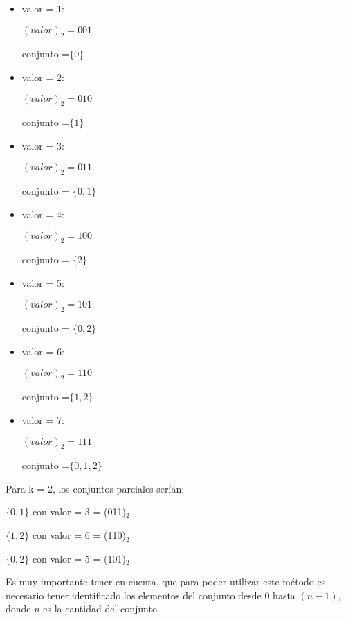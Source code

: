 \begin{itemize}
\item valor = 1:

\quad \quad $(valor)_{2} = 001$

\quad \quad conjunto =$ \lbrace 0 \rbrace $

\item valor = 2:

\quad \quad $(valor)_{2} = 010$

\quad \quad conjunto =$ \lbrace 1 \rbrace $

\item valor = 3:

\quad \quad $(valor)_{2} = 011$

\quad \quad conjunto = $\lbrace 0 , 1 \rbrace$ 

\item valor = 4:

\quad \quad $(valor)_{2} = 100$

\quad \quad conjunto = $\lbrace 2 \rbrace $

\item valor = 5:

\quad \quad $(valor)_{2} = 101$

\quad \quad conjunto = $\lbrace 0 , 2 \rbrace $

\item valor = 6:

\quad \quad $(valor)_{2} = 110$

\quad \quad conjunto =$ \lbrace 1 , 2 \rbrace $

\item valor = 7:

\quad \quad $(valor)_{2} = 111$

\quad \quad conjunto =$ \lbrace 0 , 1 , 2 \rbrace $

\end{itemize}

\quad Para k = 2, los conjuntos parciales ser\'ian:

\quad \quad \quad $\lbrace 0 , 1 \rbrace $ con valor = 3 = (011)$_2$

\quad \quad \quad $\lbrace 1 , 2 \rbrace $ con valor = 6 = (110)$_2$

\quad \quad \quad $\lbrace 0 , 2 \rbrace $ con valor = 5 = (101)$_2$


\quad


\quad Es muy importante tener en cuenta, que para poder utilizar este m\'etodo es necesario tener identificado los elementos del conjunto desde 0 hasta $(n-1)$, donde $n$ es la cantidad del conjunto.

